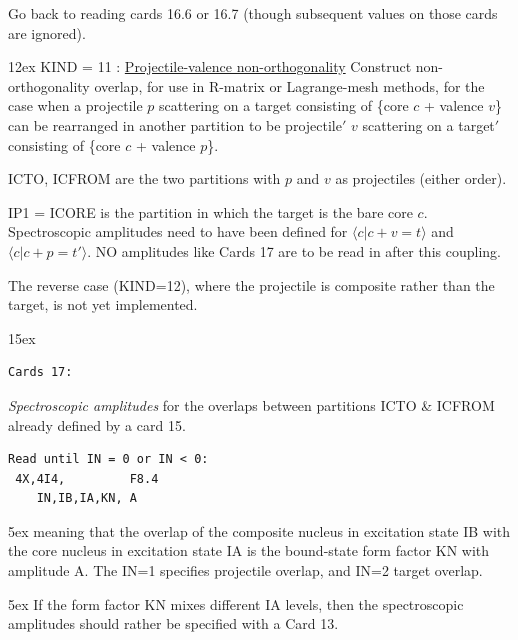 \documentclass[11pt]{article}
\begin{document}
Go back to reading cards 16.6 or 16.7 (though subsequent values on those cards are ignored).
\bigskip

\hangindent 12ex
KIND = 11 :
\underline{Projectile-valence non-orthogonality}
Construct non-orthogonality overlap, for use in R-matrix or Lagrange-mesh methods,  for the case when a 
projectile $p$ scattering on a target consisting of \{core $c$ + valence $v$\} can be rearranged in another partition 
to be projectile$'$ $v$ scattering on a target$'$ consisting of \{core $c$ + valence $p$\}.

\noindent
ICTO, ICFROM are the two partitions with $p$ and $v$ as projectiles (either order).

\noindent
IP1 = ICORE is the partition in which the target is the bare  core  $c$.\\

Spectroscopic amplitudes need to have been defined for $\langle c | c+v = t \rangle$  and $\langle c | c+p = t'  \rangle$. 
NO amplitudes like Cards 17 are to be read in after this coupling.

The reverse case (KIND=12), where the projectile is composite rather than the target, is not yet implemented.

\newpage


\hangindent 15ex
\begin{verbatim}
Cards 17:
\end{verbatim}
  {\em Spectroscopic amplitudes} {\rm for the overlaps between
partitions ICTO \& ICFROM already defined by a card 15}.

\begin{verbatim}
Read until IN = 0 or IN < 0:
 4X,4I4,         F8.4
    IN,IB,IA,KN, A
\end{verbatim}

\hangindent 5ex
meaning that the overlap of the composite nucleus in excitation
state IB with the core nucleus in excitation state IA is the
bound-state form factor KN with amplitude A. The IN=1 specifies
projectile overlap, and IN=2 target overlap.

\hangindent 5ex
 If the form factor KN mixes different IA levels, then the spectroscopic
 amplitudes should rather be specified with a Card 13.
\end{document}
